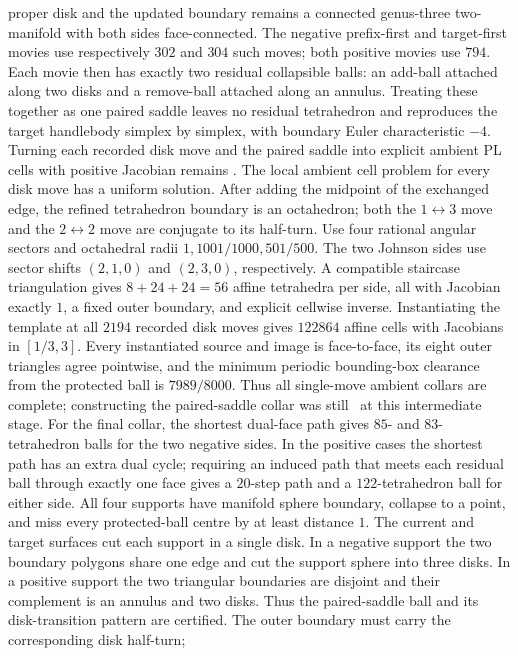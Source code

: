 proper disk and the updated boundary remains a connected genus-three
two-manifold with both sides face-connected.  The negative prefix-first and
target-first movies use respectively $302$ and $304$ such moves; both positive
movies use $794$.  Each movie then has exactly two residual collapsible balls:
an add-ball attached along two disks and a remove-ball attached along an
annulus.  Treating these together as one paired saddle leaves no residual
tetrahedron and reproduces the target handlebody simplex by simplex, with
boundary Euler characteristic $-4$.  Turning each recorded disk move and the
paired saddle into explicit ambient PL cells with positive Jacobian remains
\Open.
The local ambient cell problem for every disk move has a uniform solution.
After adding the midpoint of the exchanged edge, the refined tetrahedron
boundary is an octahedron; both the $1\leftrightarrow3$ move and the
$2\leftrightarrow2$ move are conjugate to its half-turn.  Use four rational
angular sectors and octahedral radii $1,1001/1000,501/500$.  The two Johnson
sides use sector shifts $(2,1,0)$ and $(2,3,0)$, respectively.  A compatible
staircase triangulation gives $8+24+24=56$ affine tetrahedra per side, all
with Jacobian exactly $1$, a fixed outer boundary, and explicit cellwise
inverse.  Instantiating the template at all $2194$ recorded disk moves gives
$122864$ affine cells with Jacobians in $[1/3,3]$.  Every instantiated source
and image is face-to-face, its eight outer triangles agree pointwise, and the
minimum periodic bounding-box clearance from the protected ball is
$7989/8000$.  Thus all single-move ambient collars are complete; constructing
the paired-saddle collar was still \Open\ at this intermediate stage.
For the final collar, the shortest dual-face path gives $85$- and
$83$-tetrahedron balls for the two negative sides.  In the positive cases the
shortest path has an extra dual cycle; requiring an induced path that meets
each residual ball through exactly one face gives a $20$-step path and a
$122$-tetrahedron ball for either side.  All four supports have manifold sphere
boundary, collapse to a point, and miss every protected-ball centre by at
least distance $1$.  The current and target surfaces cut each support in a
single disk.  In a negative support the two boundary polygons share one edge
and cut the support sphere into three disks.  In a positive support the two
triangular boundaries are disjoint and their complement is an annulus and two
disks.  Thus the paired-saddle ball and its disk-transition pattern are
certified.  The outer boundary must carry the corresponding disk half-turn;
